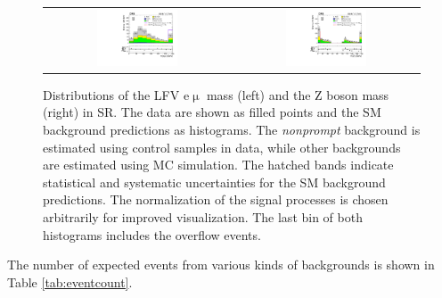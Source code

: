 \begin{figure}[tbh!]
 \begin{center}
 \begin{tabular}{cc}
 \includegraphics[width=0.45\textwidth]{figures/Part3/Nonprompt/SR/Memu}&
 \includegraphics[width=0.45\textwidth]{figures/Part3/Nonprompt/SR/Zmass} \\
 \end{tabular}
 \caption{Distributions of the LFV e$\upmu$ mass (left) and the Z boson mass (right) in \ac{SR}. The data are shown as filled points and the \ac{SM} background predictions as histograms. The \emph{nonprompt} background is estimated using control samples in data, while other backgrounds are estimated using \ac{MC} simulation. The hatched bands indicate statistical and systematic uncertainties for the \ac{SM} background predictions. The normalization of the signal processes is chosen arbitrarily for improved visualization. The last bin of both histograms includes the overflow events.}
 \label{fig:SR_DataDriven_1}
 \end{center}
\end{figure}

The number of expected events from various kinds of backgrounds is shown in Table \ref{tab:eventcount}. 


